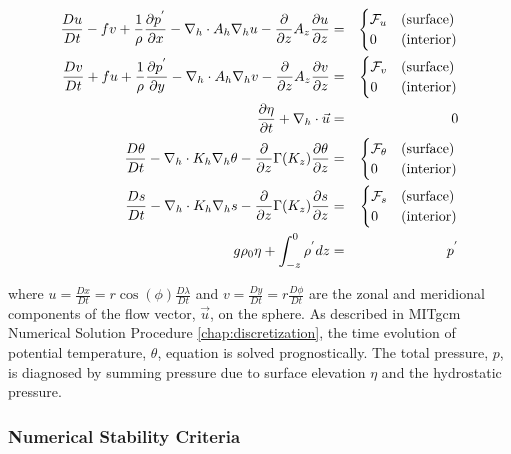 \begin{eqnarray}
\label{eq:eg-global-model_equations}
\frac{Du}{Dt} - fv +
  \frac{1}{\rho}\frac{\partial p^{'}}{\partial x} -
  \nabla_{h}\cdot A_{h}\nabla_{h}u -
  \frac{\partial}{\partial z}A_{z}\frac{\partial u}{\partial z}
 & = &
\begin{cases}
{\cal F}_u & \text{(surface)} \\
0 & \text{(interior)}
\end{cases}
\\
\frac{Dv}{Dt} + fu +
  \frac{1}{\rho}\frac{\partial p^{'}}{\partial y} -
  \nabla_{h}\cdot A_{h}\nabla_{h}v -
  \frac{\partial}{\partial z}A_{z}\frac{\partial v}{\partial z}
& = &
\begin{cases}
{\cal F}_v & \text{(surface)} \\
0 & \text{(interior)}
\end{cases}
\\
\frac{\partial \eta}{\partial t} + \nabla_{h}\cdot \vec{u}
&=&
0
\\
\frac{D\theta}{Dt} -
 \nabla_{h}\cdot K_{h}\nabla_{h}\theta
 - \frac{\partial}{\partial z}\Gamma(K_{z})\frac{\partial\theta}{\partial z}
& = &
\begin{cases}
{\cal F}_\theta & \text{(surface)} \\
0 & \text{(interior)}
\end{cases}
\\
\frac{D s}{Dt} -
 \nabla_{h}\cdot K_{h}\nabla_{h}s
 - \frac{\partial}{\partial z}\Gamma(K_{z})\frac{\partial s}{\partial z}
& = &
\begin{cases}
{\cal F}_s & \text{(surface)} \\
0 & \text{(interior)}
\end{cases}
\\
g\rho_{0} \eta + \int^{0}_{-z}\rho^{'} dz & = & p^{'}
\end{eqnarray}

\noindent where $u=\frac{Dx}{Dt}=r \cos(\phi)\frac{D \lambda}{Dt}$ and
$v=\frac{Dy}{Dt}=r \frac{D \phi}{Dt}$
are the zonal and meridional components of the
flow vector, $\vec{u}$, on the sphere. As described in
MITgcm Numerical Solution Procedure \ref{chap:discretization}, the time
evolution of potential temperature, $\theta$, equation is solved prognostically.
The total pressure, $p$, is diagnosed by summing pressure due to surface
elevation $\eta$ and the hydrostatic pressure.
\\

\subsubsection{Numerical Stability Criteria}

